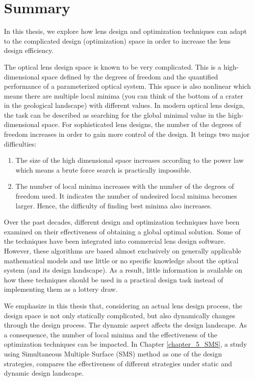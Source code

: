 \chapter*{Summary}

In this thesis, we explore how lens design and optimization techniques can adapt to the complicated design (optimization) space in order to increase the lens design efficiency. 

The optical lens design space is known to be very complicated. This is a high-dimensional space defined by the degrees of freedom and the quantified performance of a parameterized optical system. This space is also nonlinear which means there are multiple local minima (you can think of the bottom of a crater in the geological landscape) with different values. In modern optical lens design, the task can be described as searching for the global minimal value in the high-dimensional space. For sophisticated lens designs, the number of the degrees of freedom increases in order to gain more control of the design. It brings two major difficulties:  
\begin{enumerate}[nosep]
\item The size of the high dimensional space increases according to the power law which means a brute force search is practically impossible. 
\item The number of local minima increases with the number of the degrees of freedom used. It indicates the number of undesired local minima becomes larger. Hence, the difficulty of finding best minima also increases.  


\end{enumerate}

Over the past decades, different design and optimization techniques have been examined on their effectiveness of obtaining a global optimal solution. Some of the techniques have been integrated into commercial lens design software. However, these algorithms are based almost exclusively on generally applicable mathematical models and use little or no specific knowledge about the optical system (and its design landscape). As a result, little information is available on how these techniques should be used in a practical design task instead of implementing them as a lottery draw. 

We emphasize in this thesis that, considering an actual lens design process, the design space is not only statically complicated, but also dynamically changes through the design process. The dynamic aspect affects the design landscape. As a consequence, the number of local minima and the effectiveness of the optimization techniques can be impacted. In Chapter \ref{chapter_5_SMS}, a study using Simultaneous Multiple Surface (SMS) method as one of the design strategies, compares the effectiveness of different strategies under static and dynamic design landscape.

